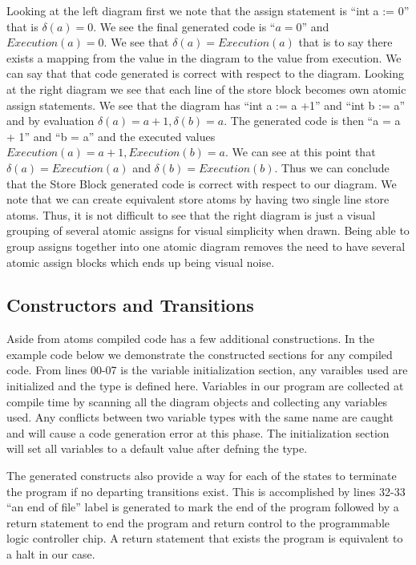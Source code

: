 Looking at the left diagram first we note that the assign statement is ``int a := 0'' that is $\delta(a) = 0$. We see the final generated code is ``$a = 0$'' and $Execution(a) = 0$. We see that $\delta(a) = Execution(a)$ that is to say there exists a mapping from the value in the diagram to the value from execution. We can say that that code generated is correct with respect to the diagram. Looking at the right diagram we see that each line of the store block becomes own atomic assign statements. We see that the diagram has ``int a := a +1'' and ``int b := a'' and by evaluation $\delta(a) = a + 1, \delta(b) = a$. The generated code is then ``a = a + 1'' and ``b = a'' and the executed values $Execution(a) = a + 1, Execution(b) = a$. We can see at this point that $\delta(a) = Execution(a)$ and $\delta(b) = Execution(b)$. Thus we can conclude that the Store Block generated code is correct with respect to our diagram. We note that we can create equivalent store atoms by having two single line store atoms. Thus, it is not difficult to see that the right diagram is just a visual grouping of several atomic assigns for visual simplicity when drawn. Being able to group assigns together into one atomic diagram removes the need to have several atomic assign blocks which ends up being visual noise.


\subsection{Constructors and Transitions}

Aside from atoms compiled code has a few additional constructions. In the example code below we demonstrate the constructed sections for any compiled code. From lines 00-07 is the variable initialization section, any varaibles used are initialized and the type is defined here. Variables in our program are collected at compile time by scanning all the diagram objects and collecting any variables used. Any conflicts between two variable types with the same name are caught and will cause a code generation error at this phase. The initialization section will set all variables to a default value after defning the type.

The generated constructs also provide a way for each of the states to terminate the program if no departing transitions exist. This is accomplished by lines 32-33 ``an end of file'' label is generated to mark the end of the program followed by a return statement to end the program and return control to the programmable logic controller chip. A return statement that exists the program is equivalent to a halt in our case.


